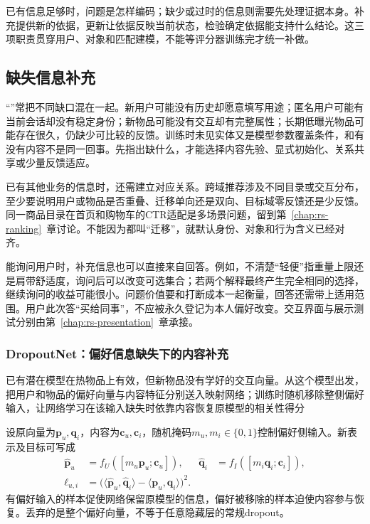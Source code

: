 已有信息足够时，问题是怎样编码；缺少或过时的信息则需要先处理证据本身。补充提供新的依据，更新让依据反映当前状态，检验确定依据能支持什么结论。这三项职责贯穿用户、对象和匹配建模，不能等评分器训练完才统一补做。

\subsection{缺失信息补充}
\label{sec:rs-missing-information}

“”常把不同缺口混在一起。新用户可能没有历史却愿意填写用途；匿名用户可能有当前会话却没有稳定身份；新物品可能没有交互却有完整属性；长期低曝光物品可能存在很久，仍缺少可比较的反馈。训练时未见实体又是模型参数覆盖条件，和有没有内容不是同一回事。先指出缺什么，才能选择内容先验、显式初始化、关系共享或少量反馈适应。

已有其他业务的信息时，还需建立对应关系。跨域推荐涉及不同目录或交互分布，至少要说明用户或物品是否重叠、迁移单向还是双向、目标域零反馈还是少反馈。同一商品目录在首页和购物车的CTR适配是多场景问题，留到第~\ref{chap:rs-ranking}~章讨论。不能因为都叫“迁移”，就默认身份、对象和行为含义已经对齐。

能询问用户时，补充信息也可以直接来自回答。例如，不清楚“轻便”指重量上限还是肩带舒适度，询问后可以改变可选集合；若两个解释最终产生完全相同的选择，继续询问的收益可能很小。问题价值要和打断成本一起衡量，回答还需带上适用范围。用户此次答“买给同事”，不应被永久登记为本人偏好改变。交互界面与展示测试分别由第~\ref{chap:rs-presentation}~章承接。

\subsubsection{DropoutNet：偏好信息缺失下的内容补充}
\label{sec:rs-dropoutnet}

已有潜在模型在热物品上有效，但新物品没有学好的交互向量。从这个模型出发，把用户和物品的偏好向量与内容特征分别送入映射网络；训练时随机移除整侧偏好输入，让网络学习在该输入缺失时依靠内容恢复原模型的相关性得分

设原向量为$\bm{p}_u,\bm{q}_i$，内容为$\bm{c}_u,\bm{c}_i$，随机掩码$m_u,m_i\in\{0,1\}$控制偏好侧输入。新表示及目标可写成
\begin{align}
  \widehat{\bm{p}}_u&=f_U([m_u\bm{p}_u;\bm{c}_u]),&
  \widehat{\bm{q}}_i&=f_I([m_i\bm{q}_i;\bm{c}_i]),\\
  \ell_{u,i}&=\bigl(
    \langle\widehat{\bm{p}}_u,\widehat{\bm{q}}_i\rangle
      -\langle\bm{p}_u,\bm{q}_i\rangle\bigr)^2.
  \label{eq:rs-dropoutnet}
\end{align}
有偏好输入的样本促使网络保留原模型的信息，偏好被移除的样本迫使内容参与恢复。丢弃的是整个偏好向量，不等于任意隐藏层的常规dropout。

